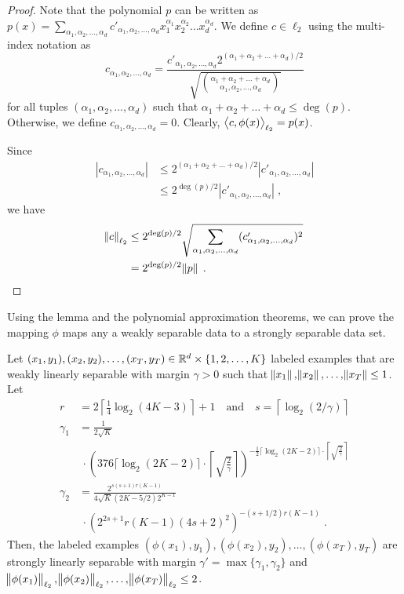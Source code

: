 \begin{proof}
Note that the polynomial $p$ can be written as
$p(x) = \sum_{\alpha_1, \alpha_2, \dots, \alpha_d} c'_{\alpha_1, \alpha_2, \dots, \alpha_d} x_1^{\alpha_1} x_2^{\alpha_2} \dots x_d^{\alpha_d}$.
We define $c \in \ell_2$ using the multi-index notation as
$$
c_{\alpha_1, \alpha_2, \dots, \alpha_d}
= \frac{c'_{\alpha_1, \alpha_2, \dots, \alpha_d} 2^{(\alpha_1 + \alpha_2 + \dots + \alpha_d)/2}}{\sqrt{\binom{\alpha_1 + \alpha_2 + \dots + \alpha_d}{\alpha_1, \alpha_2, \dots, \alpha_d}}}
$$
for all tuples $(\alpha_1, \alpha_2, \dots, \alpha_d)$ such that $\alpha_1 + \alpha_2 + \dots + \alpha_d \le \deg(p)$.
Otherwise, we define $c_{\alpha_1, \alpha_2, \dots, \alpha_d} = 0$. Clearly,
$\left\langle c, \phi(x) \right\rangle_{\ell_2} = p(x)$.

Since
\begin{align*}
|c_{\alpha_1, \alpha_2, \dots, \alpha_d}|
& \le 2^{(\alpha_1 + \alpha_2 + \dots + \alpha_d)/2} |c'_{\alpha_1, \alpha_2, \dots, \alpha_d}| \\
& \le 2^{\deg(p)/2} |c'_{\alpha_1, \alpha_2, \dots, \alpha_d}| \; ,
\end{align*}
we have
\begin{align*}
\norm{c}_{\ell_2}
& \le 2^{\deg(p)/2} \sqrt{\sum_{\alpha_1, \alpha_2, \dots, \alpha_d} (c'_{\alpha_1, \alpha_2, \dots, \alpha_d})^2} \\
& = 2^{\deg(p)/2} \norm{p} \; . \qquad \qedhere
\end{align*}
\end{proof}

Using the lemma and the polynomial approximation theorems, we can prove the
mapping $\phi$ maps any a weakly separable data to a strongly separable data
set.

\begin{theorem}
\label{theorem:margin-transformation}
Let $(x_1, y_1), (x_2, y_2), \dots, (x_T, y_T) \in \mathbb{R}^d \times \{1,2,\dots,K\}$
labeled examples that are weakly linearly separable with margin $\gamma > 0$
such that $\norm{x_1}, \norm{x_2}, \dots, \norm{x_T} \le 1$.
Let
\begin{align*}
r & = 2 \left\lceil \frac{1}{4} \log_2(4K-3) \right\rceil + 1 \quad \text{and} \quad s = \left \lceil \log_2(2/\gamma) \right \rceil \\
\gamma_1 & = \frac{1}{2\sqrt{K}}  \\
& \ \cdot \left(376 \lceil \log_2(2K-2) \rceil \cdot \left \lceil \sqrt{\frac{2}{\gamma}} \right \rceil \right)^{-\frac{1}{2} \lceil \log_2(2K-2) \rceil \cdot \left \lceil \sqrt{\frac{2}{\gamma}} \right \rceil} \\
\gamma_2 & = \frac{2^{s(s+1)r(K-1)} }{4\sqrt{K}(2K-5/2) 2^{K-1}} \\
& \ \cdot \left(2^{2s+1} r(K-1) (4s+2)^2 \right)^{-(s+1/2)r(K-1)} \; .
\end{align*}
Then, the labeled examples $(\phi(x_1), y_1), (\phi(x_2), y_2), \dots,
(\phi(x_T), y_T)$ are strongly linearly separable with margin $\gamma' =
\max\{\gamma_1, \gamma_2\}$ and $\norm{\phi(x_1)}_{\ell_2},
\norm{\phi(x_2)}_{\ell_2}, \dots, \norm{\phi(x_T)}_{\ell_2} \le 2$.
\end{theorem}

